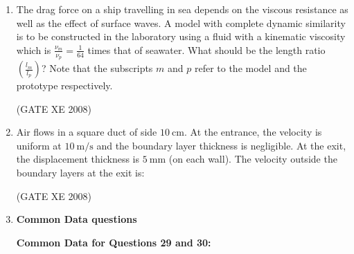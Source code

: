 \documentclass[12pt]{article}
\begin{document}
\begin{enumerate}
\begin{enumerate}
\item  shift downstream

\item  not shift

\item  shift upstream or downstream depending on the roughness height
\end{enumerate}

(GATE XE 2008)
\item The drag force on a ship travelling in sea depends on the viscous resistance as well as the effect of surface waves. A model with complete dynamic similarity is to be constructed in the laboratory using a fluid with a kinematic viscosity which is $\frac{\nu_m}{\nu_p} = \frac{1}{64}$ times that of seawater. What should be the length ratio $\left( \frac{l_m}{l_p} \right)$? Note that the subscripts $m$ and $p$ refer to the model and the prototype respectively.  

\begin{enumerate}
\end{enumerate}

(GATE XE 2008)
\item Air flows in a square duct of side $10 \ \text{cm}$. At the entrance, the velocity is uniform at $10 \ \text{m/s}$ and the boundary layer thickness is negligible. At the exit, the displacement thickness is $5 \ \text{mm}$ (on each wall). The velocity outside the boundary layers at the exit is:

\begin{enumerate}
\end{enumerate}

(GATE XE 2008)
\item[] \textbf{\Large Common Data questions}

\textbf{Common Data for Questions 29 and 30:}  


\end{enumerate}
\end{document}
